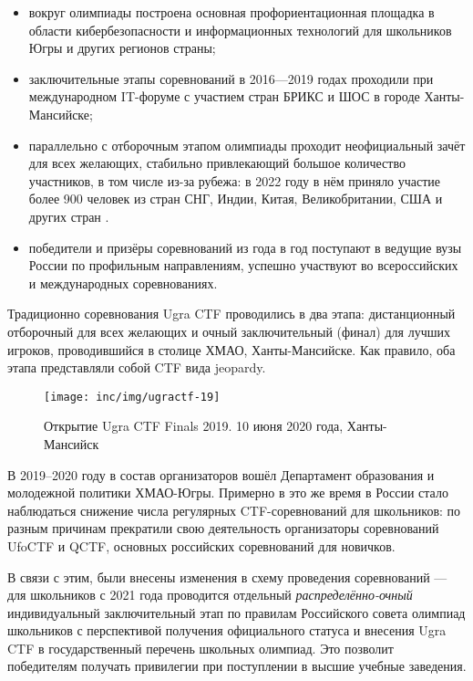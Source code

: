 \begin{itemize}
\item
  вокруг олимпиады построена основная профориентационная площадка в области кибербезопасности и информационных технологий для школьников Югры и других регионов страны;
\item
  заключительные этапы соревнований в 2016---2019 годах проходили при международном IT-форуме с участием стран БРИКС и ШОС в городе Ханты-Мансийске;
\item
  параллельно с отборочным этапом олимпиады проходит неофициальный зачёт для всех желающих, стабильно привлекающий большое количество участников, в том числе из-за рубежа: в 2022 году в нём приняло участие более 900 человек из стран СНГ, Индии, Китая, Великобритании, США и других стран \cite{Statforma}.
\item
  победители и призёры соревнований из года в год поступают в ведущие вузы России по профильным направлениям, успешно участвуют во всероссийских и международных соревнованиях.
\end{itemize}

Традиционно соревнования Ugra CTF проводились в два этапа: дистанционный отборочный для всех желающих и очный заключительный (финал) для лучших игроков, проводившийся в столице ХМАО, Ханты-Мансийске. Как правило, оба этапа представляли собой CTF вида jeopardy.

\begin{figure}
  \centering
  \texttt{[image: inc/img/ugractf-19]}
  \caption{Открытие Ugra CTF Finals 2019. 10 июня 2020 года, Ханты-Мансийск}
  \label{fig:ugractf-19}
\end{figure}


В 2019–2020 году в состав организаторов вошёл Департамент образования и молодежной политики ХМАО-Югры. Примерно в это же время в России стало наблюдаться снижение числа регулярных CTF-соревнований для школьников: по разным причинам прекратили свою деятельность организаторы соревнований UfoCTF\cite{UfoCTF} и QCTF\cite{QCTF}, основных российских соревнований для новичков.

В связи с этим, были внесены изменения в схему проведения соревнований — для школьников с 2021 года проводится отдельный \textit{распределённо-очный} индивидуальный заключительный этап по правилам Российского совета олимпиад школьников с перспективой получения официального статуса и внесения Ugra CTF в государственный перечень школьных олимпиад. Это позволит победителям получать привилегии при поступлении в высшие учебные заведения.

